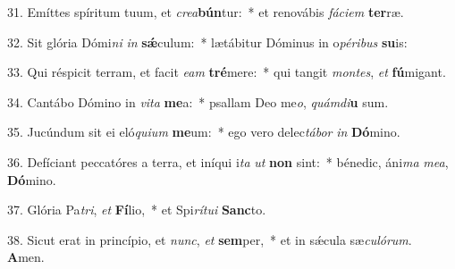 31. Emíttes spíritum tuum, et \textit{cre}\textit{a}\textbf{bún}tur:~*  et renovábis \textit{fá}\textit{ci}\textit{em} \textbf{ter}ræ.\

32. Sit glória Dómi\textit{ni} \textit{in} \textbf{sǽ}culum:~*  lætábitur Dóminus in o\textit{pé}\textit{ri}\textit{bus} \textbf{su}is:\

33. Qui réspicit terram, et facit \textit{e}\textit{am} \textbf{tré}mere:~*  qui tangit \textit{mon}\textit{tes}, \textit{et} \textbf{fú}migant.\

34. Cantábo Dómino in \textit{vi}\textit{ta} \textbf{me}a:~*  psallam Deo me\textit{o}, \textit{quám}\textit{di}\textbf{u} sum.\

35. Jucúndum sit ei eló\textit{qui}\textit{um} \textbf{me}um:~*  ego vero delec\textit{tá}\textit{bor} \textit{in} \textbf{Dó}mino.\

36. Defíciant peccatóres a terra, et iníqui i\textit{ta} \textit{ut} \textbf{non} sint:~*  bénedic, áni\textit{ma} \textit{me}\textit{a}, \textbf{Dó}mino.\

37. Glória Pa\textit{tri}, \textit{et} \textbf{Fí}lio,~*  et Spi\textit{rí}\textit{tu}\textit{i} \textbf{Sanc}to.\

38. Sicut erat in princípio, et \textit{nunc}, \textit{et} \textbf{sem}per,~*  et in sǽcula sæ\textit{cu}\textit{ló}\textit{rum}. \textbf{A}men.\

